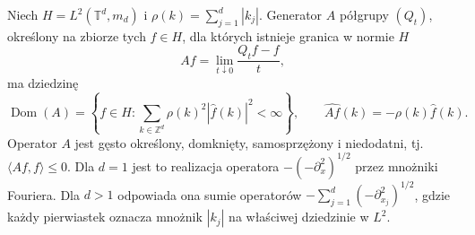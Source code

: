 \begin{twierdzenie}
\label{thm:dt-poisson-generator-l2}
Niech $H=L^2(\mathbb T^d,m_d)$ i
$\rho(k)=\sum_{j=1}^d|k_j|$.
Generator $A$ półgrupy $(Q_t)$, określony
na zbiorze tych $f\in H$, dla których istnieje
granica w normie $H$
\[
 Af=\lim_{t\downarrow0}\frac{Q_tf-f}{t},
\]
ma dziedzinę
\[
 \operatorname{Dom}(A)=
 \left\{ f\in H:
 \sum_{k\in\mathbb Z^d}\rho(k)^2|\widehat f(k)|^2
 <\infty\right\},
 \qquad
 \widehat{Af}(k)=-\rho(k)\widehat f(k).
\]
Operator $A$ jest gęsto określony, domknięty,
samosprzężony i niedodatni, tj.
$\langle Af,f\rangle\le0$.
Dla $d=1$ jest to realizacja operatora
$-(-\partial_x^2)^{1/2}$ przez mnożniki Fouriera.
Dla $d>1$ odpowiada ona sumie operatorów
$-\sum_{j=1}^d(-\partial_{x_j}^2)^{1/2}$,
gdzie każdy pierwiastek oznacza mnożnik $|k_j|$
na właściwej dziedzinie w $L^2$.
\end{twierdzenie}
